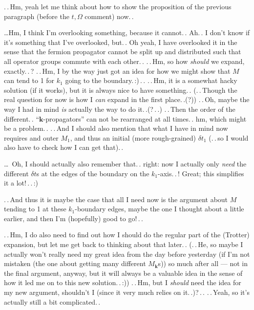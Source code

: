 \documentclass{report}
\begin{document}
.\,.\,Hm, yeah let me think about how to show the proposition of the previous paragraph (before the $t,\Omega$ comment) now.\,. %

\ldots Hm, I think I'm overlooking something, because it cannot.\,. Ah.\,. I don't know if it's something that I've overlooked, but.\,. Oh yeah, I have overlooked it in the sense that the fermion propagator cannot be split up and distributed such that all operator groups commute with each other.\,. .\,.\,Hm, so how \emph{should} we expand, exactly.\,.\,? .\,.\,Hm, I by the way just got an idea for how we might show that $M$ can tend to 1 for $k_1$ going to the boundary.\,:)\,.\,. %
.\,.\,Hm, it is a somewhat hacky solution (if it works), but it is always nice to have something.\,. (.\,.\,Though the real question for now is how I \emph{can} expand in the first place.\,.(?)) .\,.\,Oh, maybe the way I had in mind \emph{is} actually the way to do it.\,.(?\,.\,.) .\,.\,Then the order of the different.\,. ``$\boldsymbol{k}$-propagators'' can not be rearranged at all times.\,. hm, which might be a problem.\,. .\,.\,And I should also mention that what I have in mind now requires and outer $M_1$, and thus an initial (more rough-grained) $\delta t_1$ (.\,.\,so I would also have to check how I can get that).\,. 

\ldots\ Oh, I should actually also remember that.\,. right: now I actually only \emph{need} the different $\delta t$s at the edges of the boundary on the $k_1$-axis.\,.\,! Great; this simplifies it a lot!\,.\,.\,:) %

.\,.\,And thus it is maybe the case that all I need now is the argument about $M$ tending to 1 at these $k_1$-boundary edges, maybe the one I thought about a little earlier, and then I'm (hopefully) good to go!\,.\,. 

.\,.\,Hm, I do also need to find out how I should do the regular part of the (Trotter) expansion, but let me get back to thinking about that later.\,. %
(.\,.\,He, so maybe I actually won't really need my great idea from the day before yesterday (if I'm not mistaken (the one about getting many different $M_{\boldsymbol{k}}$s)) so much after all --- not in the final argument, anyway, but it will always be a valuable idea in the sense of how it led me on to this new solution.\,.\,:)) .\,.\,Hm, but I \emph{should} need the idea for my new argument, shouldn't I (since it very much relies on it.\,.)?\,.\,. .\,.\,Yeah, so it's actually still a bit complicated.\,. %
\end{document}
